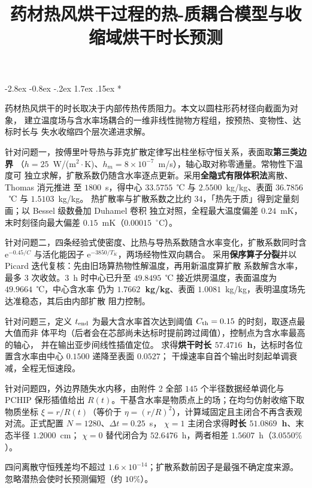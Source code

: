 \documentclass[withoutpreface,bwprint]{cumcmthesis}
\title{药材热风烘干过程的热-质耦合模型与收缩域烘干时长预测}
\makeatletter
\renewenvironment{abstract}{%
  \if@twocolumn\section*{\abstractname}%
  \else\begin{center}{\zihao{3}\bfseries \abstractname\vspace{-.5em}\vspace{\z@}}\end{center}\quotation
  \fi}{\if@twocolumn\else\endquotation\newpage\fi}
\renewcommand\section{\@startsection{section}{1}{\z@}%
	{-2.8ex \@plus -0.8ex \@minus -.2ex}%
	{1.7ex \@plus.15ex}%
	{\centering\normalfont\Large\bfseries}}
\makeatother
\begin{document}
\maketitle

\begin{abstract}

药材热风烘干的时长取决于内部传热传质阻力。本文以圆柱形药材径向截面为对象，
建立温度场与含水率场耦合的一维非线性抛物方程组，按预热、变物性、达标时长与
失水收缩四个层次递进求解。

针对问题一，按傅里叶导热与菲克扩散定律写出柱坐标守恒关系，表面取\textbf{第三类边界}
（$h=25$~W/(m$^2\cdot$K)、$h_m=8\times10^{-7}$~m/s），轴心取对称零通量。常物性下温度可
独立求解，扩散系数仍随含水率逐点更新。采用\textbf{全隐式有限体积法}离散、Thomas 消元推进
至 $1800$~s，得中心 $33.5755$~℃ 与 $2.5500$~kg/kg、表面 $36.7856$~℃ 与 $1.5103$~kg/kg。
热扩散率与扩散系数之比约 $34$，「热先于质」得到定量刻画；以 Bessel 级数叠加 Duhamel 卷积
独立对照，全程最大温度偏差 $0.24$~mK，末时刻径向最大偏差 $0.15$~mK（$0.00015$~$^\circ$C）。

针对问题二，四条经验式使密度、比热与导热系数随含水率变化，扩散系数同时含
$\mathrm{e}^{-0.45/C}$ 与活化能因子 $\mathrm{e}^{-3850/T_K}$，两场经物性双向耦合。
采用\textbf{保序算子分裂}并以 Picard 迭代复核：先由旧场算热物性解温度，再用新温度算扩散
系数解含水率，最多 $3$ 次收敛。$3$~h 时中心已升至 $49.8495$~℃ 接近烘房温度，表面温度为 $49.9664$~℃，中心含水率
仍为 \textbf{$1.7662$~kg/kg}、表面 $1.0081$~kg/kg，表明温度场先达准稳态，其后由内部扩散
阻力控制。

针对问题三，定义 $t_{\rm end}$ 为最大含水率首次达到阈值 $C_{\rm th}=0.15$ 的时刻，取逐点最大值而非
体平均（后者会在芯部尚未达标时提前跨过阈值），控制点为含水率最高的轴心，
并在输出亚步间线性插值定位。
求得\textbf{烘干时长 $57.4716$~h}，达标时各位置含水率由中心 $0.1500$ 递降至表面 $0.0527$；
干燥速率自首个输出时刻起单调衰减，全程无恒速段。

针对问题四，外边界随失水内移，由附件 2 全部 $145$ 个半径数据经单调化与 PCHIP 保形插值给出
$R(t)$。干基含水率是物质点上的场；在均匀仿射收缩下取物质坐标 $\xi=r/R(t)$（等价于
$\eta=(r/R)^2$），计算域固定且主闭合不再含表观对流。正式配置 $N=1280$、$\Delta t=0.25$~s，
$\chi=1$ 主闭合求得\textbf{时长 $51.0869$~h}、末态半径 $1.2000$~cm；
$\chi=0$ 替代闭合为 $52.6476$~h，两者相差 $1.5607$~h（$3.0550\%$）。

四问离散守恒残差均不超过 $1.6\times10^{-14}$；扩散系数前因子是最强不确定度来源。
忽略潜热会使时长预测偏短（约 $10\%$）。

\end{abstract}
\end{document}
